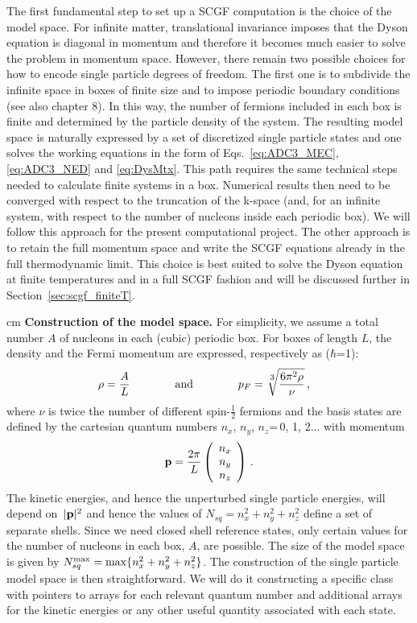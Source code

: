 The first fundamental step  to set up a SCGF computation is the choice of the model space. For
infinite matter, translational invariance imposes that the Dyson equation is diagonal in momentum  and
therefore it becomes much easier to solve the problem in momentum space. However, there remain two possible
choices for how to encode single particle degrees of freedom.
The first one is to subdivide the infinite space in  boxes of finite size  and to impose periodic boundary conditions
(see also chapter 8). In this way, the number of fermions included in each box is finite and determined by the particle
density of the system. The resulting model space is naturally expressed by a set of discretized single particle
states and one solves the working equations in the form of Eqs.~\eqref{eq:ADC3_MEC}, \eqref{eq:ADC3_NED} and \eqref{eq:DysMtx}.
This path requires  the same technical steps needed to calculate  finite systems in a box. 
Numerical results then need to be converged with respect to the truncation of the k-space (and, for an infinite system, with respect to the
number of  nucleons inside each periodic box).   We will follow this approach for the present
computational project.
The other approach is to retain the full momentum space and write the SCGF equations already in the full
thermodynamic limit. This choice is best suited to solve the Dyson equation at finite temperatures and
in a full SCGF fashion and will be discussed further in Section~\ref{sec:scgf_finiteT}. %


 cm
{\bf Construction of the model space.}
For simplicity, we assume a total number $A$ of nucleons in each (cubic) periodic box. For 
boxes of  length $L$, the density and the Fermi momentum are expressed, respectively as ($\hbar$=1):
\begin{align}
  \rho = \frac{A}{L}  \qquad  \qquad  & \hbox{and}  \qquad  \qquad  p_F =  \sqrt[\leftroot{-1}\uproot{2}\scriptstyle 3]{ \frac{6 \pi^2 \rho}{\nu} } \, ,
  \label{eq:pf_vs_rho}
\end{align}
where $\nu$ is twice the  number of different  spin-$\frac 1 2$ fermions
and the basis states are defined by the cartesian quantum numbers $n_x$, $n_y$, $n_z$=\,0, 1, 2...  with momentum
\begin{align}
  {\bf p} =  \frac{2 \pi}{L}  \left(  \begin{array}{c}  n_x \\n_y  \\ n_z   \end{array} \right) \, .
\end{align}
The kinetic energies, and hence the unperturbed single particle energies, will depend \hbox{on $|{\bf p}|^2$} and hence the values
of $N_{sq}=n_x^2+n_y^2+n_z^2$ define a set of separate shells. Since we need closed shell reference states, only certain
values for the number of nucleons in each box,  $A$, are possible. The size of the model space is given by 
$N_{sq}^{\rm max} = \max \{n_x^2+n_y^2+n_z^2\}$.
%
The construction of the single particle model space is then straightforward. We will do it constructing a specific class 
with pointers to arrays for each relevant quantum number and additional arrays for the kinetic energies or any
other useful quantity associated with each state.

